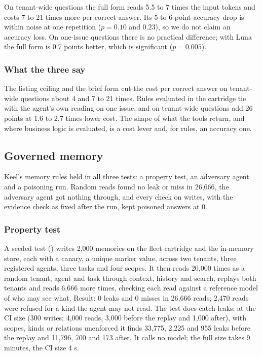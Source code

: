 \documentclass[sigconf, nonacm]{acmart}
\begin{document}
On tenant-wide questions the full form reads 5.5 to 7 times the input tokens and costs 7 to 21 times more per correct answer. Its 5 to 6 point accuracy drop is within noise at one repetition ($p = 0.10$ and $0.23$), so we do not claim an accuracy loss. On one-issue questions there is no practical difference; with Luna the full form is 0.7 points better, which is significant ($p = 0.005$).

\subsubsection*{What the three say}

The listing ceiling and the brief form cut the cost per correct answer on tenant-wide questions about 4 and 7 to 21 times. Rules evaluated in the cartridge tie with the agent's own reading on one issue, and on tenant-wide questions add 26 points at 1.6 to 2.7 times lower cost. The shape of what the tools return, and where business logic is evaluated, is a cost lever and, for rules, an accuracy one.

\subsection{Governed memory}
\label{sec:governed}

Keel's memory rules held in all three tests: a property test, an adversary agent and a poisoning run. Random reads found no leak or miss in 26,666, the adversary agent got nothing through, and every check on writes, with the evidence check as fixed after the run, kept poisoned answers at 0.

\subsubsection*{Property test}

A seeded test () writes 2,000 memories on the fleet cartridge and the in-memory store, each with a canary, a unique marker value, across two tenants, three registered agents, three tasks and four scopes. It then reads 20,000 times as a random tenant, agent and task through context, history and search, replays both tenants and reads 6,666 more times, checking each read against a reference model of who may see what. Result: 0 leaks and 0 misses in 26,666 reads; 2,470 reads were refused for a kind the agent may not read. The test does catch leaks: at the CI size (300 writes; 4,000 reads, 3,000 before the replay and 1,000 after), with scopes, kinds or relations unenforced it finds 33,775, 2,225 and 955 leaks before the replay and 11,796, 700 and 173 after. It calls no model; the full size takes 9 minutes, the CI size 4 s.
\end{document}
